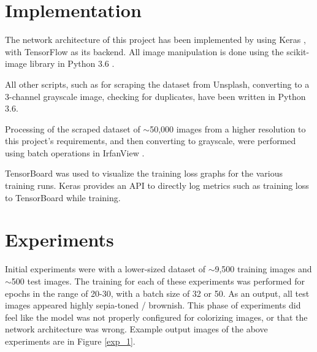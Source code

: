 \documentclass[10pt,twocolumn,letterpaper]{article}
\begin{document}
	\section{Implementation}
	The network architecture of this project has been implemented by using Keras \cite{Keras}, with TensorFlow \cite{TensorFlow} as its backend. All image manipulation is done using the scikit-image \cite{scikit-image} library in Python 3.6 \cite{Python}.

	All other scripts, such as for scraping the dataset from Unsplash, converting to a 3-channel grayscale image, checking for duplicates, have been written in Python 3.6.

	Processing of the scraped dataset of $\sim$50,000 images from a higher resolution to this project's requirements, and then converting to grayscale, were performed using batch operations in IrfanView \cite{IrfanView}.

	TensorBoard \cite{TensorFlow} was used to visualize the training loss graphs for the various training runs. Keras provides an API to directly log metrics such as training loss to TensorBoard while training.

	\section{Experiments}
	Initial experiments were with a lower-sized dataset of $\sim$9,500 training images and $\sim$500 test images. The training for each of these experiments was performed for epochs in the range of 20-30, with a batch size of 32 or 50. As an output, all test images appeared highly sepia-toned / brownish. This phase of experiments did feel like the model was not properly configured for colorizing images, or that the network architecture was wrong. Example output images of the above experiments are in Figure \ref{exp_1}.
\end{document}
